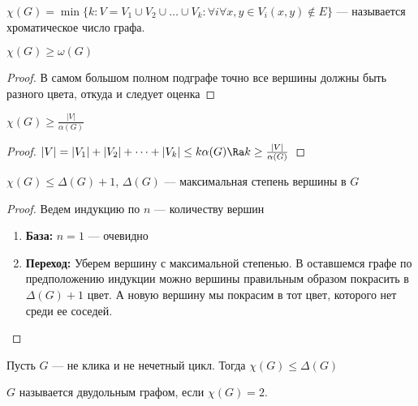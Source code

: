 
\begin{definition}
    \(\chi(G) = \min\{k: V = V_1 \cup V_2 \cup \dots \cup V_k: \forall i \forall x, y \in V_i (x, y) \notin E\}\) --- называется хроматическое число графа.
\end{definition}

\begin{proposition}
    \(\chi(G) \ge \omega(G)\)
\end{proposition}
\begin{proof}
    В самом большом полном подграфе точно все вершины должны быть разного цвета, откуда и следует оценка
\end{proof}

\begin{proposition}
    \(\chi(G) \ge \frac{|V|}{\alpha(G)}\)
\end{proposition}
\begin{proof}
    \(|V| = |V_1| + |V_2| + \dots + |V_k| \le k\alpha(G) \Ra k \ge \frac{|V|}{\alpha(G)}\)
\end{proof}

\begin{proposition}
    \(\chi(G) \le \Delta(G) + 1\), \(\Delta(G)\) --- максимальная степень вершины в \(G\)
\end{proposition}
\begin{proof}
    Ведем индукцию по \(n\) --- количеству вершин
    \begin{enumerate}
        \item[] \textbf{База:} \(n = 1\) --- очевидно
        \item[] \textbf{Переход:} Уберем вершину с максимальной степенью. В оставшемся графе по предположению индукции можно вершины правильным образом покрасить в \(\Delta(G) + 1\) цвет. А новую вершину мы покрасим в тот цвет, которого нет среди ее соседей.
    \end{enumerate}
\end{proof}

\begin{theorem}[Брукса]
    Пусть \(G\) --- не клика и не нечетный цикл. Тогда \(\chi(G) \le \Delta(G)\)
\end{theorem}

\begin{definition}
    \(G\) называется двудольным графом, если \(\chi(G) = 2\).
\end{definition}


